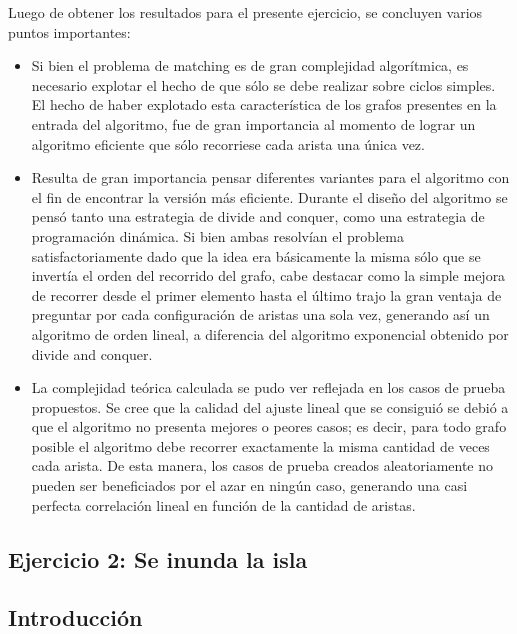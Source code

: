 \documentclass[a4paper, 12pt]{article}
\begin{document}
Luego de obtener los resultados para el presente ejercicio, se concluyen varios puntos importantes:

\begin{itemize}
\item Si bien el problema de matching es de gran complejidad algorítmica, es necesario explotar el hecho de que sólo se debe realizar sobre ciclos simples. El hecho de haber explotado esta característica de los grafos presentes en la entrada del algoritmo, fue de gran importancia al momento de lograr un algoritmo eficiente que sólo recorriese cada arista una única vez.
\item Resulta de gran importancia pensar diferentes variantes para el algoritmo con el fin de encontrar la versión más eficiente. Durante el dise\~{n}o del algoritmo se pensó tanto una estrategia de divide and conquer, como una estrategia de programación dinámica. Si bien ambas resolvían el problema satisfactoriamente dado que la idea era básicamente la misma sólo que se invertía el orden del recorrido del grafo, cabe destacar como la simple mejora de recorrer desde el primer elemento hasta el último trajo la gran ventaja de preguntar por cada configuración de aristas una sola vez, generando así un algoritmo de orden lineal, a diferencia del algoritmo exponencial obtenido por divide and conquer.
\item La complejidad teórica calculada se pudo ver reflejada en los casos de prueba propuestos. Se cree que la calidad del ajuste lineal que se consiguió se debió a que el algoritmo no presenta mejores o peores casos; es decir, para todo grafo posible el algoritmo debe recorrer exactamente la misma cantidad de veces cada arista. De esta manera, los casos de prueba creados aleatoriamente no pueden ser beneficiados por el azar en ningún caso, generando una casi perfecta correlación lineal en función de la cantidad de aristas.
\end{itemize}



\begin{center}
\item \section*{Ejercicio 2: Se inunda la isla}

\end{center}

\subsection*{Introducción}
\end{document}
